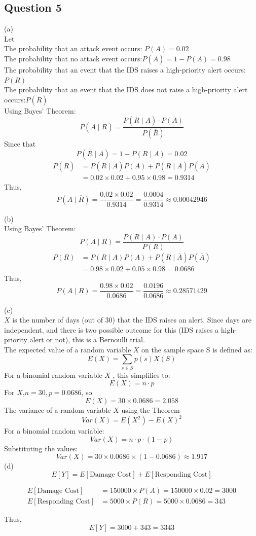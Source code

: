 \documentclass[12pt,a4paper]{article}
\begin{document}
\newpage
\subsection*{Question 5}
(a) \\
Let\\
The probability that an attack event occurs: $P(A) = 0.02$\\
The probability that no attack event occurs:$P(\overline{A}) = 1 - P(A) = 0.98$\\
The probability that an event that the IDS raises a high-priority alert occurs:$P(R)$\\
The probability that an event that the IDS does not raise a high-priority alert occurs:$P(\overline{R})$\\
Using Bayes' Theorem:\\
\[
P(A \mid \overline{R}) = \frac{P(\overline{R} \mid A) \cdot P(A)}{P(\overline{R})}
\]
Since that
\[
P(\overline{R} \mid A) = 1 - P(R \mid A) = 0.02 
\]
\begin{align*}
P(\overline{R}) &= P(\overline{R} \mid A)P(A) + P(\overline{R} \mid \overline{A})P(\overline{A}) \\
&= 0.02\times0.02 + 0.95\times0.98 = 0.9314
\end{align*}
Thus,
\[
P(A \mid \overline{R}) = \frac{0.02 \times 0.02}{0.9314} = \frac{0.0004}{0.9314} \approx 0.00042946
\]

(b)\\
Using Bayes' Theorem:\\
\[
P(A \mid R) = \frac{P(R \mid A) \cdot P(A)}{P(R)}
\]
\begin{align*}
P(R) &= P(R \mid A)P(A) + P(R \mid \overline{A})P(\overline{A}) \\
&= 0.98\times0.02 + 0.05\times0.98 = 0.0686
\end{align*}
Thus,
\[
P(A \mid R) = \frac{0.98 \times 0.02}{0.0686} = \frac{0.0196}{0.0686} \approx 0.28571429
\]

(c)\\
$X$ is the number of days (out of 30) that the IDS raises an alert. Since days are independent, and there is two possible outcome for this (IDS raises a high-priority alert or not), this is a Bernoulli trial.\\

The expected value of a random variable $X$ on the sample space S is defined as:
\[
E(X) = \sum_{s \in S} p(s)X(S)
\]
For a binomial random variable $X$ , this simplifies to:
\[
E(X) = n \cdot p
\]
For $X$,$n = 30, p = 0.0686$, so
\[
E(X) = 30 \times 0.0686 = 2.058
\]
The variance of a random variable $X$ using the Theorem 
\[Var(X) = E(X^2) - E(X)^2
\]
For a binomial random variable:
\[
Var(X) = n \cdot p \cdot (1 - p)
\]
Substituting the values:
\[
Var(X) = 30 \times 0.0686 \times (1 - 0.0686) \approx 1.917
\]
(d)\\

\[
E[Y] =E[\text{Damage Cost}]  +E[\text{Responding Cost}]
\]


\begin{align*}
E[\text{Damage Cost}] &= 150000 \times P(A) = 150000 \times 0.02 = 3000 \\
E[\text{Responding Cost}] &= 5000 \times P(R) = 5000 \times 0.0686 = 343
\end{align*}

Thus,
\[
E[Y] = 3000 + 343 = 3343
\]
\end{document}
